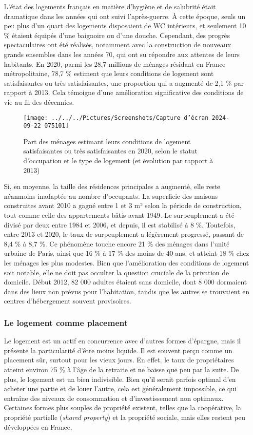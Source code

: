 \documentclass[a4paper, 12pt]{report}
\begin{document}
L’état des logements français en matière d’hygiène et de salubrité était dramatique dans les années qui ont suivi l’après-guerre. À cette époque, seuls un peu plus d’un quart des logements disposaient de WC intérieurs, et seulement 10 \% étaient équipés d’une baignoire ou d’une douche. Cependant, des progrès spectaculaires ont été réalisés, notamment avec la construction de nouveaux grands ensembles dans les années 70, qui ont su répondre aux attentes de leurs habitants. En 2020, parmi les 28,7 millions de ménages résidant en France métropolitaine, 78,7 \% estiment que leurs conditions de logement sont satisfaisantes ou très satisfaisantes, une proportion qui a augmenté de 2,1 \% par rapport à 2013. Cela témoigne d'une amélioration significative des conditions de vie au fil des décennies.
\newpage
\begin{wrapfigure}{r}{0.6\textwidth}
	\centering
\texttt{[image: ../../../Pictures/Screenshots/Capture d'écran 2024-09-22 075101]}
\caption{Part des ménages estimant leurs conditions de logement satisfaisantes ou très satisfaisantes en 2020, selon le statut d’occupation et le type de logement (et évolution par rapport à 2013)}
\end{wrapfigure}

Si, en moyenne, la taille des résidences principales a augmenté, elle reste néanmoins inadaptée au nombre d’occupants. La superficie des maisons construites avant 2010 a gagné entre 1 et 3 m² selon la période de construction, tout comme celle des appartements bâtis avant 1949. Le surpeuplement a été divisé par deux entre 1984 et 2006, et depuis, il est stabilisé à 8 \%. Toutefois, entre 2013 et 2020, le taux de surpeuplement a légèrement progressé, passant de 8,4 \% à 8,7 \%. Ce phénomène touche encore 21 \% des ménages dans l’unité urbaine de Paris, ainsi que 16 \% à 17 \% des moins de 40 ans, et atteint 18 \% chez les ménages les plus modestes. Bien que l'amélioration des conditions de logement soit notable, elle ne doit pas occulter la question cruciale de la privation de domicile. Début 2012, 82 000 adultes étaient sans domicile, dont 8 000 dormaient dans des lieux non prévus pour l’habitation, tandis que les autres se trouvaient en centres d’hébergement souvent provisoires.

\subsubsection{Le logement comme placement}

Le logement est un actif en concurrence avec d'autres formes d’épargne, mais il présente la particularité d'être moins liquide. Il est souvent perçu comme un placement sûr, surtout pour les vieux jours. En effet, le taux de propriétaires atteint environ 75 \% à l’âge de la retraite et ne baisse que peu par la suite. De plus, le logement est un bien indivisible. Bien qu'il serait parfois optimal d'en acheter une partie et de louer l'autre, cela est généralement impossible, ce qui entraîne des niveaux de consommation et d’investissement non optimaux. Certaines formes plus souples de propriété existent, telles que la coopérative, la propriété partielle (\textit{shared property}) et la propriété sociale, mais elles restent peu développées en France.
\end{document}
